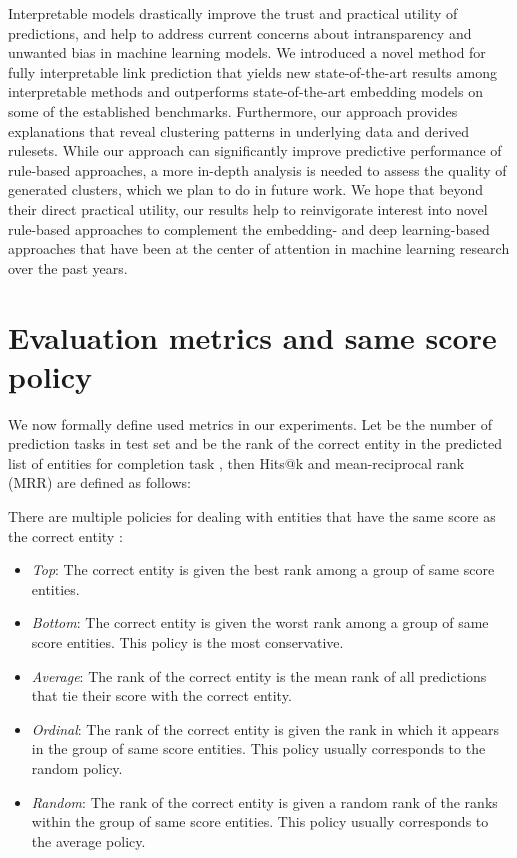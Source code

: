 \documentclass[akbc,twoside,11pt,lettersize]{article}
\begin{document}
Interpretable models drastically improve the trust and practical utility of predictions, and help to address current concerns about intransparency and unwanted bias in machine learning models. We introduced a novel method for fully interpretable link prediction that yields new state-of-the-art results among interpretable methods and outperforms state-of-the-art embedding models on some of the established benchmarks. Furthermore, our approach provides explanations that reveal clustering patterns in underlying data and derived rulesets. While our approach can significantly improve predictive performance of rule-based approaches, a more in-depth analysis is needed to assess the quality of generated clusters, which we plan to do in future work. We hope that beyond their direct practical utility, our results help to reinvigorate interest into novel rule-based approaches to complement the embedding- and deep learning-based approaches that have been at the center of attention in machine learning research over the past years.






\newpage

\appendix


\section{Evaluation metrics and same score policy}
\label{appendix:eval}

We now formally define used metrics in our experiments. Let  be the number of prediction tasks in test set  and  be the rank of the correct entity in the predicted list of entities for completion task , then Hits@k and mean-reciprocal rank (MRR) are defined as follows:


There are multiple policies for dealing with entities that have the same score as the correct entity \cite{Rossi2021}: 

\begin{itemize}
  \item \textit{Top}: The correct entity is given the best rank among a group of same score entities.
  \item \textit{Bottom}: The correct entity is given the worst rank among a group of same score entities. This policy is the most conservative.
  \item \textit{Average}: The rank of the correct entity is the mean rank of all predictions that tie their score with the correct entity.
  \item \textit{Ordinal}: The rank of the correct entity is given the rank in which it appears in the group of same score entities. This policy usually corresponds to the random policy.
  \item \textit{Random}: The rank of the correct entity is given a random rank of the ranks within the group of same score entities. This policy usually corresponds to the average policy.
\end{itemize}
\end{document}
